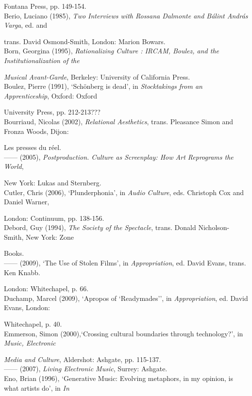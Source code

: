 Fontana Press, pp. 149-154. 
\hypertarget{berio}{}\\
Berio, Luciano (1985), \emph{Two Interviews with Rossana Dalmonte and B\'{a}lint Andr\'{a}s Varga},  ed. and 

trans. David Osmond-Smith, London: Marion Bowars. 
\hypertarget{born}{}\\
Born, Georgina (1995), \emph{Rationalizing Culture : IRCAM, Boulez, and the Institutionalization of the}

\emph{Musical Avant-Garde}, Berkeley: University of California Press. 
\hypertarget{boulez}{}\\
Boulez, Pierre (1991), `Sch\"{o}nberg is dead', in \emph{Stocktakings from an Apprenticeship}, Oxford: Oxford 

University Press, pp. 212-213??? 
\hypertarget{relational}{}\\
Bourriaud, Nicolas (2002), \emph{Relational Aesthetics}, trans. Pleasance Simon and Fronza Woods, Dijon: 

Les presses du r\'{e}el.
\hypertarget{postproduction}{}\\
------ (2005),  \emph{Postproduction. Culture as Screenplay: How Art Reprograms the World}, 

New York: Lukas and Sternberg.
\hypertarget{cutler}{}\\
Cutler, Chris (2006),  `Plunderphonia', in \emph{Audio Culture}, eds. Christoph Cox and Daniel Warner, 

London: Continuum, pp. 138-156.
\hypertarget{debord}{}\\
Debord, Guy (1994), \emph{The Society of the Spectacle}, trans. Donald Nicholson-Smith, New York: Zone 

Books.
\hypertarget{debord2}{}\\
------ (2009), `The Use of Stolen Films', in \emph{Appropriation}, ed. David Evans, trans. Ken Knabb. 

London: Whitechapel, p. 66.
\hypertarget{duchamp}{}\\
Duchamp, Marcel (2009), `Apropos of `Readymades'', in \emph{Appropriation}, ed. David Evans, London: 

Whitechapel, p. 40.
\hypertarget{emmersoncross}{}\\
Emmerson, Simon (2000),`Crossing cultural boundaries through technology?',  in \emph{Music, Electronic}

\emph{Media and Culture}, Aldershot: Ashgate, pp. 115-137. 
\hypertarget{emmersonliving}{}\\
------ (2007), \emph{Living Electronic Music}, Surrey: Ashgate. 
\hypertarget{eno}{}\\
Eno, Brian (1996), `Generative Music: Evolving metaphors, in my opinion, is what artists do', in \emph{In}

